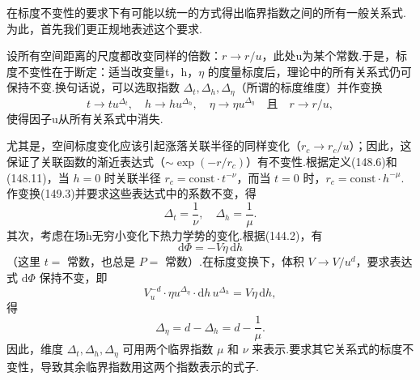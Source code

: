 在标度不变性的要求下有可能以统一的方式得出临界指数之间的所有一般关系式.为此，首先我们更正规地表述这个要求.

设所有空间距离的尺度都改变同样的倍数：$r\to r/u$，此处u为某个常数.于是，标度不变性在于断定：适当改变量t，h，$\eta$ 的度量标度后，理论中的所有关系式仍可保持不变.换句话说，可以选取指数 $\Delta_t,\Delta_h,\Delta_\eta$（所谓的标度维度）并作变换
\begin{equation}
  t\to tu^{\Delta_t},\quad h\to hu^{\Delta_h},\quad
  \eta\to\eta u^{\Delta_\eta}\quad\text{且}\quad r\to r/u,
\end{equation}
使得因子u从所有关系式中消失.

尤其是，空间标度变化应该引起涨落关联半径的同样变化（$r_c\to r_c/u$）；因此，这保证了关联函数的渐近表达式（$\sim\exp(-r/r_c)$）有不变性.根据定义(148.6)和(148.11)，当 $h=0$ 时关联半径 $r_c=\mathrm{const}\cdot t^{-\nu}$，而当 $t=0$ 时，$r_c=\mathrm{const}\cdot h^{-\mu}$.作变换(149.3)并要求这些表达式中的系数不变，得
\begin{equation}
  \Delta_t=\frac{1}{\nu},\quad\Delta_h=\frac{1}{\mu}.
\end{equation}
其次，考虑在场h无穷小变化下热力学势的变化.根据(144.2)，有
\begin{equation*}
  \mathrm{d}\Phi=-V\eta\,\mathrm{d}h
\end{equation*}
（这里 $t=$ 常数，也总是 $P=$ 常数）.在标度变换下，体积 $V\to V/u^d$，要求表达式 $\mathrm{d}\Phi$ 保持不变，即
\begin{equation*}
  V_u^{-d}\cdot\eta u^{\Delta_\eta}\cdot\mathrm{d}h\,u^{\Delta_h}=V\eta\,\mathrm{d}h,
\end{equation*}
得
\begin{equation}
  \Delta_\eta=d-\Delta_h=d-\frac{1}{\mu}.
\end{equation}
因此，维度 $\Delta_t,\Delta_h,\Delta_\eta$ 可用两个临界指数 $\mu$ 和 $\nu$ 来表示.要求其它关系式的标度不变性，导致其余临界指数用这两个指数表示的式子.

